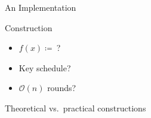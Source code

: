 \begin{frame}{An Implementation}
{\begin{minipage}{0.40\textwidth}
    \end{minipage}
    \hfill
    \begin{minipage}{0.56\textwidth}
        \centering
        \begin{block}{Construction}
            \begin{itemize}
                \item $f(x) \coloneqq\ $?
                \item Key schedule?
                \item $\mathcal{O}(n)$ rounds?
            \end{itemize}
        \end{block}
        \vspace{5pt}
        Theoretical vs.\ practical constructions
    \end{minipage}
    }
\end{frame}

